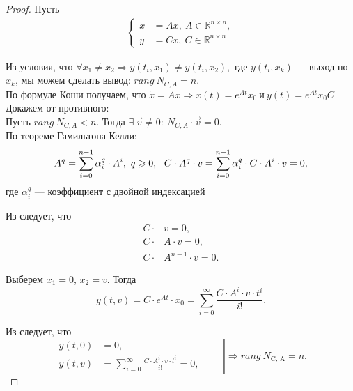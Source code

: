 \documentclass[../../TAU.tex]{subfiles}
\begin{document}
    \begin{proof}
        
        Пусть
        \begin{align*}
            \begin{cases}
                \dot x &= Ax,\ A\in\mathbb{R}^{n\times n}, \\
                y &= Cx,\ C\in\mathbb{R}^{n\times n}
            \end{cases}
        \end{align*}

        Из условия, что 
        $
            \forall x_1\neq x_2 \Rightarrow y(t_i,x_1) \neq y(t_i,x_2),
        $
        где $y(t_i,x_k)$ --- выход по $x_k$, мы можем сделать вывод:
        $rang\ N_{C, A}=n$.\\
        По формуле Коши получаем, что 
        $
            \dot x = Ax \Rightarrow x(t) = e^{At}x_0\ \text{и}\ y(t)= e^{At}x_0C
        $\\
        Докажем от противного:\\
        Пусть $rang\ N_{C, A}<n$. Тогда $\exists\ \vec v\neq0:\ N_{C, A}\cdot\vec v = 0$.\\
        По теореме Гамильтона-Келли:
        \begin{equation}
            A^q=\sum_{i=0}^{n-1}\alpha_i^q\cdot A^i,\ q\geqslant 0,\ \ C\cdot A^q\cdot v=\sum_{i=0}^{n-1}\alpha_i^q\cdot C \cdot A^i \cdot v = 0, 
            \label{EQ21}
        \end{equation}
        где $\alpha_i^q$ --- коэффициент с двойной индексацией

        Из  следует, что
        \begin{align*}
            C\cdot& v = 0,              \\
            C\cdot& A \cdot v = 0,      \\
            C\cdot& A^{n-1}\cdot v = 0.
        \end{align*}


        Выберем $x_1=0$, $x_2=v$. Тогда
        \begin{equation}
            y(t,v)=C\cdot e^{At}\cdot x_0 = \sum_{i=0}^\infty\frac{C\cdot A^i\cdot v\cdot t^i}{i!}.
            \label{EQ21_1}
        \end{equation}

        Из  следует, что
        \begin{equation*}
        \left.
            \begin{aligned}
                y(t,0)&=0,                                                       \\
                y(t,v)&=\sum_{i=0}^\infty\frac{C\cdot A^i\cdot v\cdot t^i}{i!}=0,
            \end{aligned}
        \qquad \right|\Rightarrow rang\ N_\text{C, A}=n.
        \end{equation*}


\end{proof}
\end{document}
